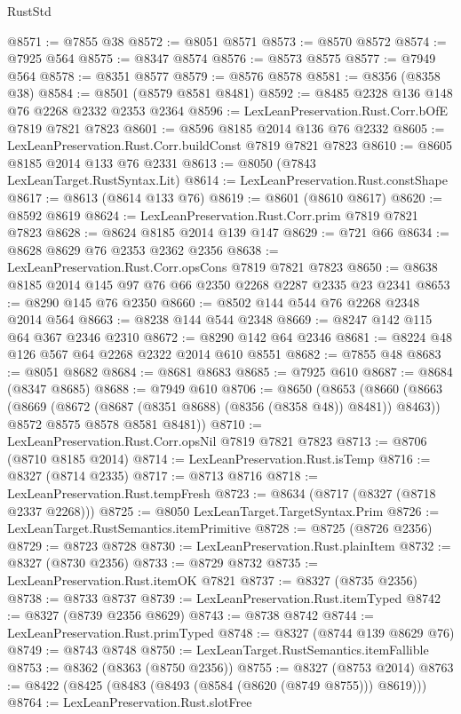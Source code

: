 \begin{lexlean}{RustStd}
\begin{coremodule}
@8571 := @7855 @38
@8572 := @8051 @8571
@8573 := @8570 @8572
@8574 := @7925 @564
@8575 := @8347 @8574
@8576 := @8573 @8575
@8577 := @7949 @564
@8578 := @8351 @8577
@8579 := @8576 @8578
@8581 := @8356 (@8358 @38)
@8584 := @8501 (@8579 @8581 @8481)
@8592 := @8485 @2328 @136 @148 @76 @2268 @2332 @2353 @2364
@8596 := LexLeanPreservation.Rust.Corr.bOfE @7819 @7821 @7823
@8601 := @8596 @8185 @2014 @136 @76 @2332
@8605 := LexLeanPreservation.Rust.Corr.buildConst @7819 @7821 @7823
@8610 := @8605 @8185 @2014 @133 @76 @2331
@8613 := @8050 (@7843 LexLeanTarget.RustSyntax.Lit)
@8614 := LexLeanPreservation.Rust.constShape
@8617 := @8613 (@8614 @133 @76)
@8619 := @8601 (@8610 @8617)
@8620 := @8592 @8619
@8624 := LexLeanPreservation.Rust.Corr.prim @7819 @7821 @7823
@8628 := @8624 @8185 @2014 @139 @147
@8629 := @721 @66
@8634 := @8628 @8629 @76 @2353 @2362 @2356
@8638 := LexLeanPreservation.Rust.Corr.opsCons @7819 @7821 @7823
@8650 := @8638 @8185 @2014 @145 @97 @76 @66 @2350 @2268 @2287 @2335 @23 @2341
@8653 := @8290 @145 @76 @2350
@8660 := @8502 @144 @544 @76 @2268 @2348 @2014 @564
@8663 := @8238 @144 @544 @2348
@8669 := @8247 @142 @115 @64 @367 @2346 @2310
@8672 := @8290 @142 @64 @2346
@8681 := @8224 @48 @126 @567 @64 @2268 @2322 @2014 @610 @8551
@8682 := @7855 @48
@8683 := @8051 @8682
@8684 := @8681 @8683
@8685 := @7925 @610
@8687 := @8684 (@8347 @8685)
@8688 := @7949 @610
@8706 := @8650
    (@8653
      (@8660
        (@8663 (@8669 (@8672 (@8687 (@8351 @8688) (@8356 (@8358 @48)) @8481)) @8463))
        @8572
        @8575
        @8578
        @8581
        @8481))
@8710 := LexLeanPreservation.Rust.Corr.opsNil @7819 @7821 @7823
@8713 := @8706 (@8710 @8185 @2014)
@8714 := LexLeanPreservation.Rust.isTemp
@8716 := @8327 (@8714 @2335)
@8717 := @8713 @8716
@8718 := LexLeanPreservation.Rust.tempFresh
@8723 := @8634 (@8717 (@8327 (@8718 @2337 @2268)))
@8725 := @8050 LexLeanTarget.TargetSyntax.Prim
@8726 := LexLeanTarget.RustSemantics.itemPrimitive
@8728 := @8725 (@8726 @2356)
@8729 := @8723 @8728
@8730 := LexLeanPreservation.Rust.plainItem
@8732 := @8327 (@8730 @2356)
@8733 := @8729 @8732
@8735 := LexLeanPreservation.Rust.itemOK @7821
@8737 := @8327 (@8735 @2356)
@8738 := @8733 @8737
@8739 := LexLeanPreservation.Rust.itemTyped
@8742 := @8327 (@8739 @2356 @8629)
@8743 := @8738 @8742
@8744 := LexLeanPreservation.Rust.primTyped
@8748 := @8327 (@8744 @139 @8629 @76)
@8749 := @8743 @8748
@8750 := LexLeanTarget.RustSemantics.itemFallible
@8753 := @8362 (@8363 (@8750 @2356))
@8755 := @8327 (@8753 @2014)
@8763 := @8422 (@8425 (@8483 (@8493 (@8584 (@8620 (@8749 @8755))) @8619)))
@8764 := LexLeanPreservation.Rust.slotFree

\end{coremodule}
\end{lexlean}
